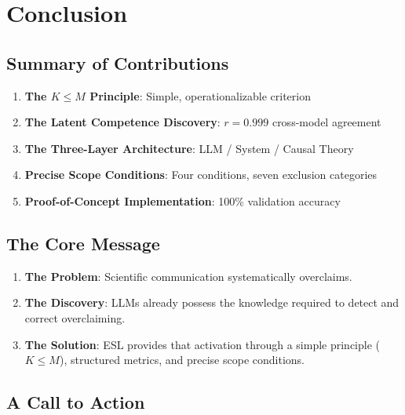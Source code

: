 
\section{Conclusion}

\subsection{Summary of Contributions}

\begin{enumerate}
    \item \textbf{The $K \leq M$ Principle}: Simple, operationalizable criterion
    \item \textbf{The Latent Competence Discovery}: $r = 0.999$ cross-model agreement
    \item \textbf{The Three-Layer Architecture}: LLM / System / Causal Theory
    \item \textbf{Precise Scope Conditions}: Four conditions, seven exclusion categories
    \item \textbf{Proof-of-Concept Implementation}: 100\% validation accuracy
\end{enumerate}


\subsection{The Core Message}

\begin{principlebox}
\begin{enumerate}
    \item \textbf{The Problem}: Scientific communication systematically overclaims.
    \item \textbf{The Discovery}: LLMs already possess the knowledge required to detect and correct overclaiming.
    \item \textbf{The Solution}: ESL provides that activation through a simple principle ($K \leq M$), structured metrics, and precise scope conditions.
\end{enumerate}
\end{principlebox}


\subsection{A Call to Action}

